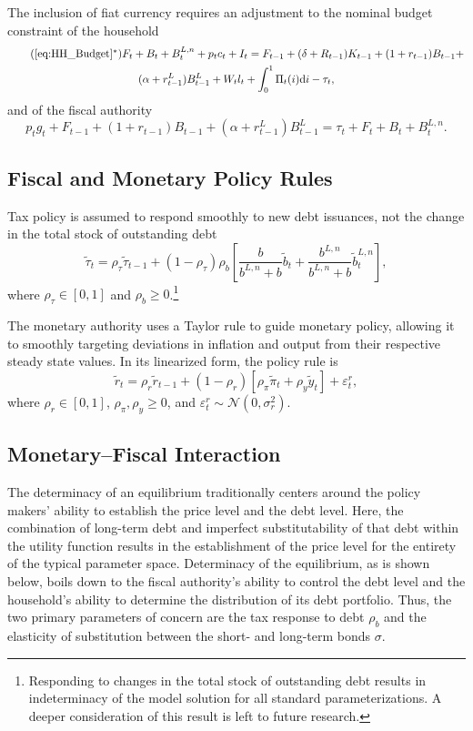 \documentclass[11pt,a4paper,margin=1.5in]{article}
\begin{document}
The inclusion of fiat currency requires an adjustment to the nominal budget constraint of the household
\begin{multline} \tag{\ref{eq:HH_Budget}$^*$}
	F_t + B_t + B^{L,n}_t + p_tc_t + I_t = F_{t-1} + (\delta + R_{t-1})K_{t-1} + (1+r_{t-1})B_{t-1} + \\ (\alpha + r^L_{t-1})B^L_{t-1} + W_tl_t + \int^1_0\Pi_t(i)\text{d}i - \tau_t,
	\label{eq:AltHH_Budget}
\end{multline}
and of the fiscal authority
\begin{equation}
\label{eq:FiscalBudget}
	p_tg_t + F_{t-1} + (1+r_{t-1})B_{t-1} + (\alpha +r^L_{t-1})B^L_{t-1} = \tau_t + F_t + B_t + B^{L,n}_t. 
\end{equation}

\subsection{Fiscal and Monetary Policy Rules}
Tax policy is assumed to respond smoothly to new debt issuances, not the change in the total stock of outstanding debt
\begin{equation}
\label{eq:FiscalRule}
	\tilde{\tau}_t = \rho_\tau \tilde{\tau}_{t-1} + (1-\rho_\tau)\rho_b\left[\frac{b}{b^{L,n}+b}\tilde{b}_t + \frac{b^{L,n}}{b^{L,n}+b}\tilde{b}^{L,n}_t\right],
\end{equation}
where $\rho_\tau \in [0,1]$ and $\rho_b \geq 0$.\footnote{
	Responding to changes in the total stock of outstanding debt results in indeterminacy of the model solution for all standard parameterizations.
	A deeper consideration of this result is left to future research.}

The monetary authority uses a Taylor rule to guide monetary policy, allowing it to smoothly targeting deviations in inflation and output from their respective steady state values. 
In its linearized form, the policy rule is
\begin{equation}
\label{eq:MonetaryPolicy}
	\tilde{r}_t = \rho_r \tilde{r}_{t-1} + (1-\rho_r)\left[\rho_\pi \tilde{\pi}_t + \rho_y\tilde{y}_t\right] + \varepsilon^r_t,
\end{equation}
where $\rho_r \in [0,1]$, $\rho_\pi, \rho_y \geq 0$, and $\varepsilon^r_t \sim \mathcal{N}(0,\sigma_r^2)$. 

\subsection{Monetary--Fiscal Interaction}
The determinacy of an equilibrium traditionally centers around the policy makers' ability to establish the price level and the debt level.
Here, the combination of long-term debt and imperfect substitutability of that debt within the utility function results in the establishment of the price level for the entirety of the typical parameter space.
Determinacy of the equilibrium, as is shown below, boils down to the fiscal authority's ability to control the debt level and the household's ability to determine the distribution of its debt portfolio.
Thus, the two primary parameters of concern are the tax response to debt $\rho_b$ and the elasticity of substitution between the short- and long-term bonds $\sigma$. 
\end{document}
